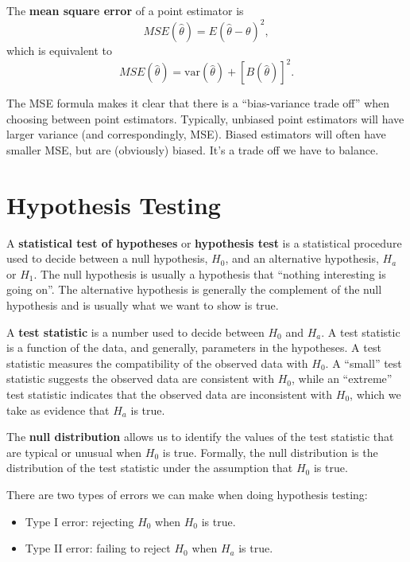 \documentclass[
]{book}
\providecommand{\tightlist}{%
  \setlength{\itemsep}{0pt}\setlength{\parskip}{0pt}}
\theoremstyle{definition}
\theoremstyle{definition}
\theoremstyle{definition}
\theoremstyle{definition}
\theoremstyle{remark}
\begin{document}
The \textbf{mean square error} of a point estimator is
\[
MSE(\hat{\theta})=E(\hat{\theta}-\theta)^{2},
\]
which is equivalent to
\[
MSE(\hat{\theta})=\mathrm{var}(\hat{\theta})+[B(\hat{\theta})]^{2}.
\]

The MSE formula makes it clear that there is a ``bias-variance trade off'' when choosing between point estimators. Typically, unbiased point estimators will have larger variance (and correspondingly, MSE). Biased estimators will often have smaller MSE, but are (obviously) biased. It's a trade off we have to balance.

\hypertarget{hypothesis-testing}{%
\section{Hypothesis Testing}\label{hypothesis-testing}}

A \textbf{statistical test of hypotheses} or \textbf{hypothesis test} is a
statistical procedure used to decide between a null hypothesis, \(H_0\), and an alternative hypothesis, \(H_a\) or \(H_1\). The null hypothesis is usually a hypothesis that ``nothing interesting is going on''. The alternative hypothesis is generally the complement of the null hypothesis and is usually what we want to show is true.

A \textbf{test statistic} is a number used to decide between \(H_0\) and \(H_a\). A test statistic is a function of the data, and generally, parameters in the hypotheses. A test statistic measures the compatibility of the observed data with \(H_0\). A ``small'' test statistic suggests the observed data are consistent with \(H_0\), while an ``extreme'' test statistic indicates that the observed data are inconsistent with \(H_0\), which we take as evidence that \(H_a\) is true.

The \textbf{null distribution} allows us to identify the values of the test statistic that are typical or unusual when \(H_0\) is true. Formally, the null distribution is the distribution of the test statistic under the assumption that \(H_0\) is true.

There are two types of errors we can make when doing hypothesis testing:

\begin{itemize}
\tightlist
\item
  Type I error: rejecting \(H_0\) when \(H_0\) is true.
\item
  Type II error: failing to reject \(H_0\) when \(H_a\) is true.
\end{itemize}
\end{document}
